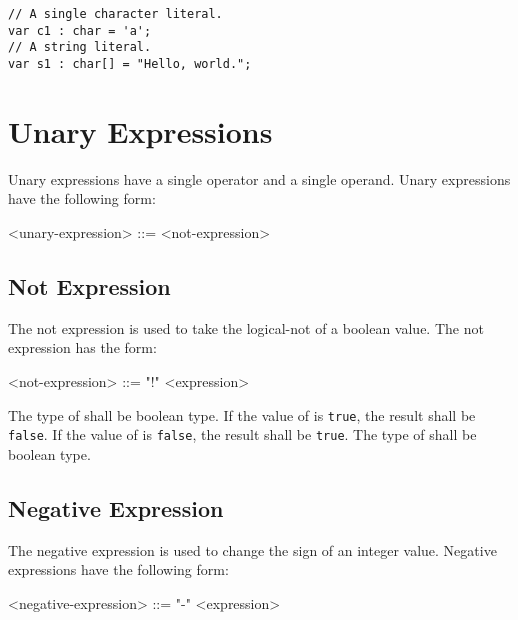 \begin{minip}
\begin{lstlisting}
// A single character literal.
var c1 : char = 'a';
// A string literal.
var s1 : char[] = "Hello, world."; 
\end{lstlisting}
\end{minip}

\section{Unary Expressions} \label{guide:unary_expr}

Unary expressions have a single operator and a single operand. Unary expressions have the following form:

\begin{minip}
\begin{grammar}
<unary-expression> ::= 
<not-expression>
\end{grammar}
\end{minip}

\subsection{Not Expression} \label{guide:not_expr}

The not expression is used to take the logical-not of a boolean value. The not expression has the form: 

\begin{minip}
\begin{grammar}
<not-expression> ::= "!" <expression> 
\end{grammar}
\end{minip}

The type of  shall be boolean type. If the value of  is \texttt{true}, the result shall be \texttt{false}. If the value of  is \texttt{false}, the result shall be \texttt{true}. The type of  shall be boolean type.

\subsection{Negative Expression} \label{neg_expr_guide}

The negative expression is used to change the sign of an integer value. Negative expressions have the following form:

\begin{minip}
\begin{grammar}
<negative-expression> ::= "-" <expression>
\end{grammar}
\end{minip}

